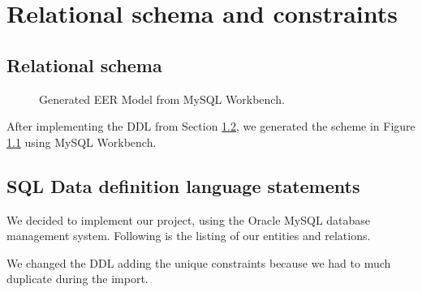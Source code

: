 %
%
%
%

\chapter{Relational schema and constraints}

\section{Relational schema}

\begin{figure}[h!]
	\centering
	\caption{Generated EER Model from MySQL Workbench.\label{fig:ddl-scheme}}
\end{figure}
After implementing the DDL from Section \ref{sec:ddl}, we generated the scheme in Figure \ref{fig:ddl-scheme} using MySQL Workbench.

\newpage
\section{SQL Data definition language statements}
\label{sec:ddl}

We decided to implement our project, using the Oracle MySQL database management system. Following is the listing of our entities and relations.

We changed the DDL adding the unique constraints because we had to much duplicate during the import.

\begin{center}
	
\end{center}
\newpage

\begin{center}
	
\end{center}


